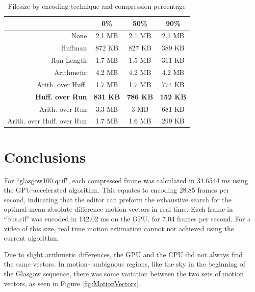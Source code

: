 \documentclass[10pt,twocolumn,twoside]{IEEEtran}
\begin{document}
\begin{table}[htdp]
\caption{Filesize by encoding technique and compression percentage}
\vskip -15pt
\label{table:filesize}
\small{
\begin{center}
\begin{tabular}{|r|c|c|c|}
\hline
 & 0\%  & 50\% & 90\% \\
 \hline
 None & 2.1 MB & 2.1 MB & 2.1 MB\\
 \hline
 Huffman & 872 KB & 827 KB & 389 KB\\
 \hline
 Run-Length & 1.7 MB & 1.5 MB & 311 KB\\
 \hline
 Arithmetic & 4.2 MB & 4.2 MB & 4.2 MB\\
 \hline
 Arith. over Huff. & 1.7 MB & 1.7 MB & 774 KB\\
 \hline
 \textbf{Huff. over Run} & \textbf{831 KB} & \textbf{786 KB} & \textbf{152 KB}\\
 \hline
 Arith. over Run & 3.3 MB & 3 MB & 681 KB\\
 \hline
 Arith. over Huff. over Run & 1.7 MB & 1.6 MB & 299 KB\\
 \hline
\end{tabular}
\end{center}
}
\end{table}


\section{Conclusions}
For ``glasgow100.qcif", each compressed frame was calculated in 34.6544 ms using the GPU-accelerated 
algorithm. This equates to encoding 28.85 frames per second, indicating that the editor can preform the 
exhaustive search for the optimal mean absolute difference motion vectors in real time. Each frame in 
``bus.cif" was encoded in 142.02 ms on the GPU, for 7.04 frames per second. For a video of this size, real 
time motion estimation cannot not achieved using the current algorithm.

Due to slight arithmetic differences, the GPU and the CPU did not always find the same vectors. In motion-
ambiguous regions, like the sky in the beginning of the Glasgow sequence, there was some variation between the 
two sets of motion vectors, as seen in Figure \ref{fig:MotionVectors}.
\end{document}
